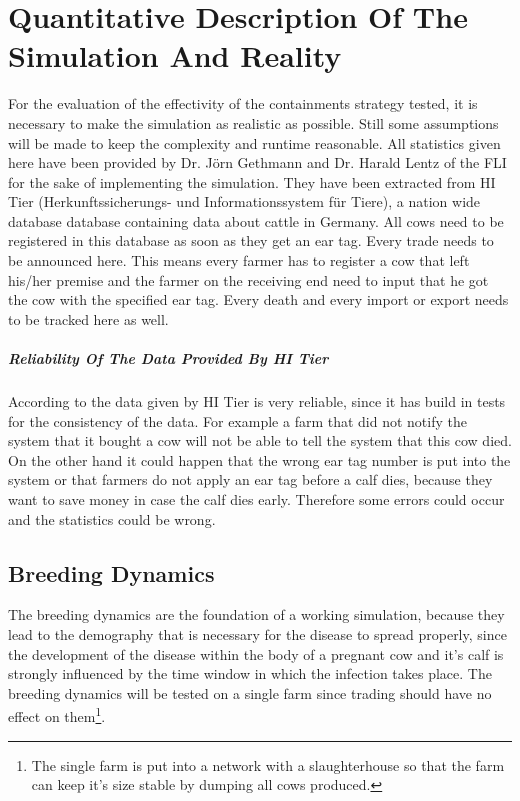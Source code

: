 \chapter{Quantitative Description Of The Simulation And Reality}
For the evaluation of the effectivity of the containments strategy tested, it is necessary to make the simulation as realistic as possible. Still some assumptions will be made to keep the complexity and runtime reasonable. 
All statistics given here have been provided by Dr. Jörn Gethmann and Dr. Harald Lentz of the FLI for the sake of implementing the simulation. They have been extracted from HI Tier (Herkunftssicherungs- und Informationssystem für Tiere), a nation wide database database containing data about cattle in Germany. All cows need to be registered in this database as soon as they get an ear tag. Every trade needs to be announced here. This means every farmer has to register a cow that left his/her premise and the farmer on the receiving end need to input that he got the cow with the specified ear tag. Every death and every import or export needs to be tracked here as well.
\paragraph{Reliability Of The Data Provided By HI Tier}
According to \citep{personalCom} the data given by HI Tier is very reliable, since it has build in tests for the consistency of the data. For example a farm that did not notify the system that it bought a cow will not be able to tell the system that this cow died. On the other hand it could happen that the wrong ear tag number is put into the system or that farmers do not apply an ear tag before a calf dies, because they want to save money in case the calf dies early. Therefore some errors could occur and the statistics could be wrong.
\section{Breeding Dynamics}
The breeding dynamics are the foundation of a working simulation, because they lead to the demography that is necessary for the disease to spread properly, since the development of the disease within the body of a pregnant cow and it's calf is strongly influenced by the time window in which the infection takes place.
The breeding dynamics will be tested on a single farm since trading should have no effect on them\footnote{The single farm is put into a network with a slaughterhouse so that the farm can keep it's size stable by dumping all cows produced.}.
